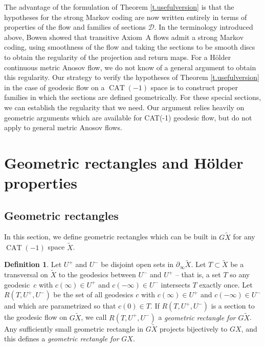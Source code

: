 \documentclass[10pt]{amsart}
\let\mathcal\mathscr
\theoremstyle{definition}
\newtheorem{defn}[thm]{Definition}
\numberwithin{equation}{section}
\DeclareMathOperator{\CAT}{CAT}
\newcommand\DDD{\mathcal D}
\begin{document}
The advantage of the formulation of Theorem \ref{t.usefulversion} is that the hypotheses for the strong Markov coding are now written entirely in terms of properties of the flow and families of sections $\DDD$. In the terminology introduced above, Bowen showed that transitive Axiom~A flows admit a strong Markov coding, using smoothness of the flow and taking the sections to be smooth discs to obtain the regularity of the projection and return maps. For a Hölder continuous metric Anosov flow, we do not know of a general argument to obtain this regularity. Our strategy to verify the hypotheses of Theorem \ref{t.usefulversion} in the case of geodesic flow on a $\CAT(-1)$ space is to construct proper families in which the sections are defined geometrically. For these special sections, we can establish the regularity that we need. Our argument relies heavily on geometric arguments which are available for CAT(-1) geodesic flow, but do not apply to general metric Anosov flows.

\section{Geometric rectangles and Hölder properties}\label{sec:good rectangles}

\subsection{Geometric rectangles} \label{subsec:geom rect}

In this section, we define geometric rectangles which can be built in $G\tilde X$ for any $\CAT(-1)$ space $\tilde X$.

\begin{defn}\label{def:geom rectangle}
Let $U^+$ and $U^-$ be disjoint open sets in $\partial_\infty \tilde X$. Let $T \subset \tilde X$ be a transversal on $\tilde X$ to the geodesics between $U^-$ and $U^+$ -- that is, a set $T$ so any geodesic~$c$ with $c(\infty)\in U^+$ and $c(-\infty) \in U^-$ intersects $T$ exactly once. Let $R(T, U^+, U^-)$ be the set of all geodesics $c$ with $c(\infty)\in U^+$ and $c(-\infty) \in U^-$ and which are parametrized so that $c(0)\in T$. If $R(T,U^+,U^-)$ is a section to the geodesic flow on $G \tilde X$, we call $R(T,U^+,U^-)$ a \emph{geometric rectangle for $G\tilde X$}. Any sufficiently small geometric rectangle in $G\tilde X$ projects bijectively to $GX$, and this defines a \emph{geometric rectangle for $GX$}.
\end{defn}
\end{document}
